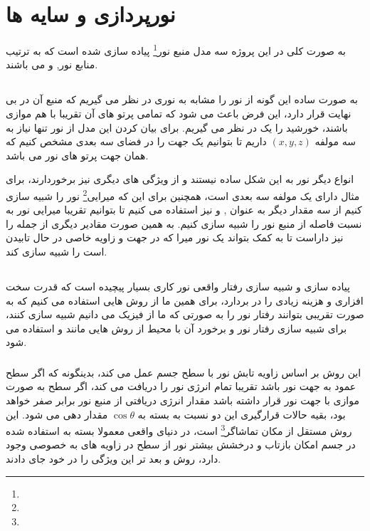 \documentclass[a4paper, 12pt]{report}
\begin{document}
\newpage
\section{\fontsize{15pt}{1.0cm}\zarbold\textbf{نورپردازی و سایه ها}}
\vspace*{0.6cm}
\noindent
\normalsize

    به صورت کلی در این پروژه سه مدل منبع نور\footnote{} پیاده سازی شده است که به ترتیب منابع نور,  و  می باشند.
\subsection{}
    به صورت ساده این گونه از نور را مشابه به نوری در نظر می گیریم که منبع آن در بی نهایت قرار دارد، این فرض باعث می شود که تمامی پرتو های آن تقریبا با هم موازی باشند، خورشید را یک  در نظر می گیریم. برای بیان کردن این مدل از نور تنها نیاز به سه مولفه
    $(x, y, z)$
    داریم تا بتوانیم یک جهت را در فضای سه بعدی مشخص کنیم که همان جهت پرتو های نور می باشد.\par
    انواع دیگر نور به این شکل ساده نیستند و از ویژگی های دیگری نیز برخوردارند، برای مثال  دارای یک مولفه سه بعدی  است، همچنین برای این که میرایی\footnote{} نور را شبیه سازی کنیم از سه مقدار دیگر به عنوان ,  و  نیز استفاده می کنیم تا بتوانیم تقریبا میرایی نور به نسبت فاصله از منبع نور را شبیه سازی کنیم. به همین صورت مقادیر دیگری از جمله  را نیز داراست تا به کمک  بتواند یک نور میرا که در جهت و زاویه خاصی در حال تابیدن است را شبیه سازی کند.

\subsection{}
    پیاده سازی و شبیه سازی رفتار واقعی نور کاری بسیار پیچیده است که قدرت سخت افزاری و هزینه زیادی را در بردارد، برای همین ما از روش هایی استفاده می کنیم که به صورت تقریبی بتوانند رفتار نور را به صورتی که ما از فیزیک می دانیم شبیه سازی کنند، برای شبیه سازی رفتار نور و برخورد آن با محیط از روش هایی مانند  و  استفاده می شود.

    \subsubsection{}
        این روش بر اساس زاویه تابش نور با سطح جسم عمل می کند، بدینگونه که اگر سطح عمود به جهت نور باشد تقریبا تمام انرژی نور را دریافت می کند، اگر سطح به صورت موازی با جهت نور قرار داشته باشد مقدار انرژی دریافتی از منبع نور برابر صفر خواهد بود، بقیه حالات قرارگیری این دو نسبت به بسته به
        $\cos \theta$
        مقدار دهی می شود. این روش مستقل از مکان تماشاگر\footnote{} است، در دنیای واقعی معمولا بسته به  استفاده شده در جسم امکان بازتاب و درخشش بیشتر نور از سطح در زاویه های به خصوصی وجود دارد، روش  و بعد تر  این ویژگی را در خود جای دادند.
\end{document}
